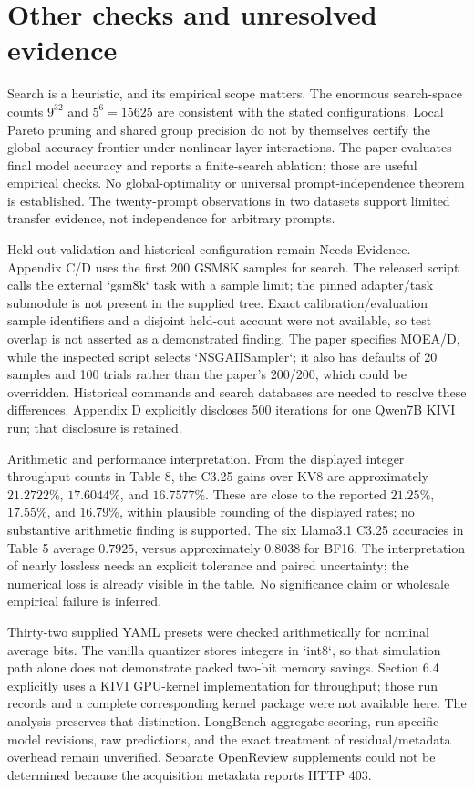 \documentclass[10pt]{article}
\begin{document}
\section*{Other checks and unresolved evidence}
Search is a heuristic, and its empirical scope matters. The enormous search-space counts \(9^{32}\) and \(5^6=15625\) are consistent with the stated configurations. Local Pareto pruning and shared group precision do not by themselves certify the global accuracy frontier under nonlinear layer interactions. The paper evaluates final model accuracy and reports a finite-search ablation; those are useful empirical checks. No global-optimality or universal prompt-independence theorem is established. The twenty-prompt observations in two datasets support limited transfer evidence, not independence for arbitrary prompts.\par
Held-out validation and historical configuration remain Needs Evidence. Appendix C/D uses the first 200 GSM8K samples for search. The released script calls the external `gsm8k` task with a sample limit; the pinned adapter/task submodule is not present in the supplied tree. Exact calibration/evaluation sample identifiers and a disjoint held-out account were not available, so test overlap is not asserted as a demonstrated finding. The paper specifies MOEA/D, while the inspected script selects `NSGAIISampler`; it also has defaults of 20 samples and 100 trials rather than the paper’s 200/200, which could be overridden. Historical commands and search databases are needed to resolve these differences. Appendix D explicitly discloses 500 iterations for one Qwen7B KIVI run; that disclosure is retained.\par
Arithmetic and performance interpretation. From the displayed integer throughput counts in Table 8, the C3.25 gains over KV8 are approximately \(21.2722\%\), \(17.6044\%\), and \(16.7577\%\). These are close to the reported \(21.25\%\), \(17.55\%\), and \(16.79\%\), within plausible rounding of the displayed rates; no substantive arithmetic finding is supported. The six Llama3.1 C3.25 accuracies in Table 5 average \(0.7925\), versus approximately \(0.8038\) for BF16. The interpretation of nearly lossless needs an explicit tolerance and paired uncertainty; the numerical loss is already visible in the table. No significance claim or wholesale empirical failure is inferred.\par
Thirty-two supplied YAML presets were checked arithmetically for nominal average bits. The vanilla quantizer stores integers in `int8`, so that simulation path alone does not demonstrate packed two-bit memory savings. Section 6.4 explicitly uses a KIVI GPU-kernel implementation for throughput; those run records and a complete corresponding kernel package were not available here. The analysis preserves that distinction. LongBench aggregate scoring, run-specific model revisions, raw predictions, and the exact treatment of residual/metadata overhead remain unverified. Separate OpenReview supplements could not be determined because the acquisition metadata reports HTTP 403.\par
\end{document}
